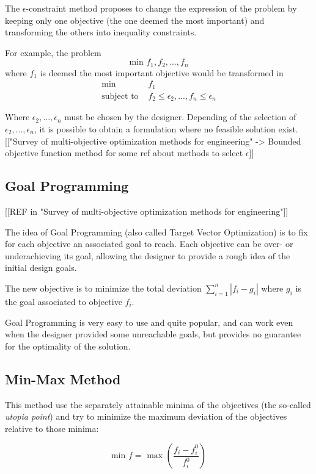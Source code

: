 The $\epsilon$-constraint method proposes to change the expression of the problem by keeping only one objective (the one deemed the most important) and transforming the others into inequality constraints.

For example, the problem \[\text{min } f_1, f_2, ...,f_n\] where $f_1$ is deemed the most important objective would be transformed in
\begin{align*}
\text{min } &f_1 \\
\text{subject to } &f_2 \leq \epsilon_2, ..., f_n \leq \epsilon_n
\end{align*}

Where $\epsilon_2, ..., \epsilon_n$ must be chosen by the designer.
Depending of the selection of $\epsilon_2, ..., \epsilon_n$, it is possible to obtain a formulation where no feasible solution exist.
[["Survey of multi-objective optimization methods for engineering" -> Bounded objective function method for some ref about methods to select $\epsilon$]]

\subsection{Goal Programming}

[[REF in "Survey of multi-objective optimization methods for engineering"]]

The idea of Goal Programming (also called Target Vector Optimization) is to fix for each objective an associated goal to reach. Each objective can be over- or underachieving its goal, allowing the designer to provide a rough idea of the initial design goals.

The new objective is to minimize the total deviation $\sum_{i=1}^n |f_i - g_i|$ where $g_i$ is the goal associated to objective $f_i$.

Goal Programming is very easy to use and quite popular, and can work even when the designer provided some unreachable goals, but provides no guarantee for the optimality of the solution.

\subsection{Min-Max Method}

This method use the separately attainable minima of the objectives (the so-called \emph{utopia point}) and try to minimize the maximum deviation of the objectives relative to those minima:

\[ \text{min } f = \text{ max } \left( \frac{f_i - f_i^0}{f_i^0} \right) \]

